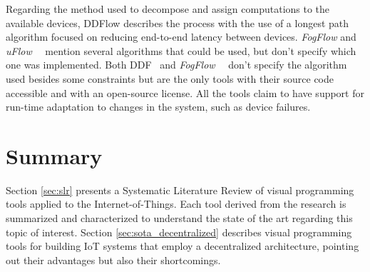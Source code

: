 Regarding the method used to decompose and assign computations to the available devices, DDFlow describes the process with the use of a longest path algorithm focused on reducing end-to-end latency between devices. \textit{FogFlow} and \textit{uFlow}~\cite{fog_flow}~\cite{flow_based_programming_fog} mention several algorithms that could be used, but don't specify which one was implemented. Both DDF~\cite{ddf} and \textit{FogFlow}~\cite{fog_flow_easy}~\cite{fog_flow_tool} don't specify the algorithm used besides some constraints but are the only tools with their source code accessible and with an open-source license. All the tools claim to have support for run-time adaptation to changes in the system, such as device failures.


\section{Summary}

Section \ref{sec:slr} presents a Systematic Literature Review of visual programming tools applied to the Internet-of-Things. Each tool derived from the research is summarized and characterized to understand the state of the art regarding this topic of interest. Section \ref{sec:sota_decentralized} describes visual programming tools for building IoT systems that employ a decentralized architecture, pointing out their advantages but also their shortcomings.

